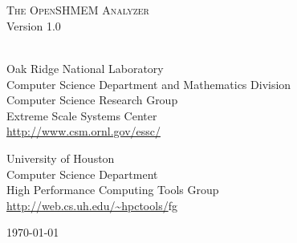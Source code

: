 \begin{titlepage}
  \begin{center}

    \vspace{1.0in} ~ \\

    \HRule \\[0.1in]
    {\LARGE \textsc{The OpenSHMEM Analyzer}} \\
    \vspace{0.2in}
    {\LARGE Version 1.0} \\
    \HRule \\[0.5in]

    \vspace{0.5in}

    Oak Ridge National Laboratory \\
    Computer Science Department and Mathematics Division \\
    Computer Science Research Group \\
    Extreme Scale Systems Center \\
    \vspace{0.1in}
    \url{http://www.csm.ornl.gov/essc/}

    \vspace{0.4in}

    University of Houston \\
    Computer Science Department \\
    High Performance Computing Tools Group \\
    \vspace{0.1in}
    \url{http://web.cs.uh.edu/~hpctools/}fg

    \vspace{1.0in}

    \today

  \end{center}
\end{titlepage}
